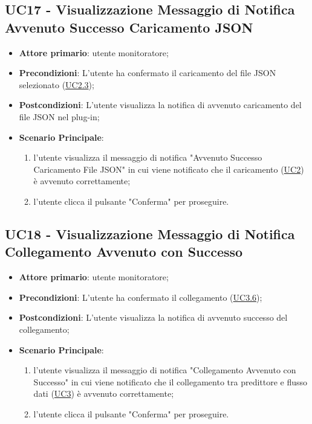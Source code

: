 	
	\label{par:UC17}
	\subsection{UC17 - Visualizzazione Messaggio di Notifica Avvenuto Successo Caricamento JSON}
		\begin{itemize}
			\item\textbf{Attore primario}: utente monitoratore;
			\item\textbf{Precondizioni}: L’utente ha confermato il caricamento del file JSON selezionato  (\hyperref[par:UC2.3]{UC2.3});
			\item\textbf{Postcondizioni}: L’utente visualizza la notifica di avvenuto caricamento del file JSON nel plug-in; 
			\item\textbf{Scenario Principale}: 
				\begin{enumerate} 
					\item l’utente visualizza il messaggio di notifica "Avvenuto Successo Caricamento File JSON" in cui viene notificato che il caricamento (\hyperref[par:UC2]{UC2}) è avvenuto correttamente;
					\item l'utente clicca il pulsante "Conferma" per proseguire.		
				\end{enumerate}		
		\end{itemize}

	
	\label{par:UC18}
	\subsection{UC18 - Visualizzazione Messaggio di Notifica Collegamento Avvenuto con Successo}
		\begin{itemize}
			\item\textbf{Attore primario}: utente monitoratore;
			\item\textbf{Precondizioni}: L’utente ha confermato il collegamento (\hyperref[par:UC3.6]{UC3.6});
			\item\textbf{Postcondizioni}: L’utente visualizza la notifica di avvenuto successo del collegamento; 
			\item\textbf{Scenario Principale}: 
				\begin{enumerate} 
					\item l’utente visualizza il messaggio di notifica "Collegamento Avvenuto con Successo" in cui viene notificato che il collegamento tra predittore e flusso dati (\hyperref[par:UC3]{UC3}) è avvenuto correttamente;
					\item l'utente clicca il pulsante "Conferma" per proseguire.		
				\end{enumerate}		
		\end{itemize}
	
